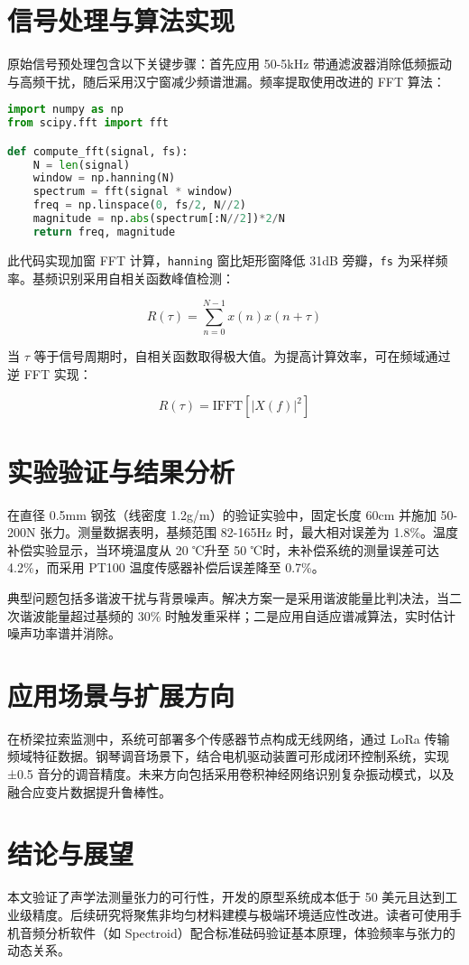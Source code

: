\chapter{信号处理与算法实现}
原始信号预处理包含以下关键步骤：首先应用 50-5kHz 带通滤波器消除低频振动与高频干扰，随后采用汉宁窗减少频谱泄漏。频率提取使用改进的 FFT 算法：\par
\begin{lstlisting}[language=python]
import numpy as np
from scipy.fft import fft

def compute_fft(signal, fs):
    N = len(signal)
    window = np.hanning(N)
    spectrum = fft(signal * window)
    freq = np.linspace(0, fs/2, N//2)
    magnitude = np.abs(spectrum[:N//2])*2/N
    return freq, magnitude
\end{lstlisting}
此代码实现加窗 FFT 计算，\verb!hanning! 窗比矩形窗降低 31dB 旁瓣，\verb!fs! 为采样频率。基频识别采用自相关函数峰值检测：\par
$$ R(\tau) = \sum_{n=0}^{N-1} x(n)x(n+\tau) $$\par
当 $\tau$ 等于信号周期时，自相关函数取得极大值。为提高计算效率，可在频域通过逆 FFT 实现：\par
$$ R(\tau) = \text{IFFT}\left[ |X(f)|^2 \right] $$\par
\chapter{实验验证与结果分析}
在直径 0.5mm 钢弦（线密度 1.2g/m）的验证实验中，固定长度 60cm 并施加 50-200N 张力。测量数据表明，基频范围 82-165Hz 时，最大相对误差为 1.8\%{}。温度补偿实验显示，当环境温度从 20 ℃升至 50 ℃时，未补偿系统的测量误差可达 4.2\%{}，而采用 PT100 温度传感器补偿后误差降至 0.7\%{}。\par
典型问题包括多谐波干扰与背景噪声。解决方案一是采用谐波能量比判决法，当二次谐波能量超过基频的 30\%{} 时触发重采样；二是应用自适应谱减算法，实时估计噪声功率谱并消除。\par
\chapter{应用场景与扩展方向}
在桥梁拉索监测中，系统可部署多个传感器节点构成无线网络，通过 LoRa 传输频域特征数据。钢琴调音场景下，结合电机驱动装置可形成闭环控制系统，实现 ±0.5 音分的调音精度。未来方向包括采用卷积神经网络识别复杂振动模式，以及融合应变片数据提升鲁棒性。\par
\chapter{结论与展望}
本文验证了声学法测量张力的可行性，开发的原型系统成本低于 50 美元且达到工业级精度。后续研究将聚焦非均匀材料建模与极端环境适应性改进。读者可使用手机音频分析软件（如 Spectroid）配合标准砝码验证基本原理，体验频率与张力的动态关系。\par
